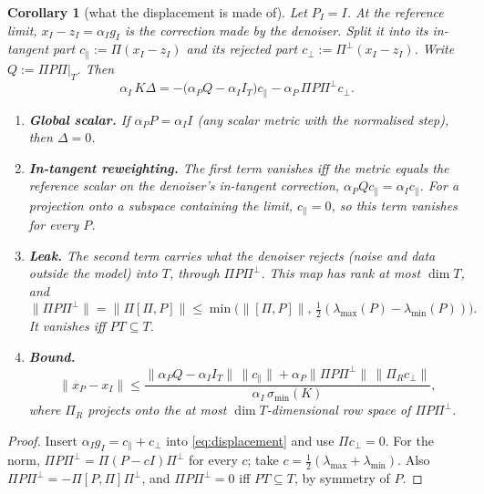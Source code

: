 \documentclass[11pt]{article}
\newtheorem{corollary}[theorem]{Corollary}
\theoremstyle{definition}
\theoremstyle{remark}
\newcommand{\norm}[1]{\lVert #1\rVert}
\newcommand{\lmin}{\lambda_{\min}}
\newcommand{\lmax}{\lambda_{\max}}
\begin{document}
\begin{corollary}[what the displacement is made of]\label{cor:displacement}
Let $P_I=I$. At the reference limit, $x_I-z_I=\alpha_Ig_I$ is the correction made by the denoiser. Split it into
its in-tangent part $c_\parallel:=\Pi(x_I-z_I)$ and its rejected part $c_\perp:=\Pi^\perp(x_I-z_I)$. Write
$Q:=\Pi P\Pi|_T$. Then
\begin{equation}\label{eq:dispsplit}
  \alpha_I\,K\Delta=-\big(\alpha_PQ-\alpha_II_T\big)c_\parallel-\alpha_P\,\Pi P\Pi^\perp c_\perp .
\end{equation}
\begin{enumerate}
\item \textbf{Global scalar.} If $\alpha_PP=\alpha_II$ (any scalar metric with the normalised step), then $\Delta=0$.
\item \textbf{In-tangent reweighting.} The first term vanishes iff the metric equals the reference scalar on the
  denoiser's in-tangent correction, $\alpha_PQc_\parallel=\alpha_Ic_\parallel$. For a projection onto a subspace
  containing the limit, $c_\parallel=0$, so this term vanishes for every $P$.
\item \textbf{Leak.} The second term carries what the denoiser \emph{rejects} (noise and data outside the model)
  into $T$, through $\Pi P\Pi^\perp$. This map has rank at most $\dim T$, and
  \[
  \norm{\Pi P\Pi^\perp}=\norm{\Pi[\Pi,P]}\leq\min\big(\norm{[\Pi,P]},\,\tfrac12(\lmax(P)-\lmin(P))\big).
  \]
  It vanishes iff $PT\subseteq T$.
\item \textbf{Bound.}
  \[
  \norm{x_P-x_I}\leq\frac{\norm{\alpha_PQ-\alpha_II_T}\,\norm{c_\parallel}+\alpha_P\norm{\Pi P\Pi^\perp}\,\norm{\Pi_Rc_\perp}}{\alpha_I\,\sigma_{\min}(K)},
  \]
  where $\Pi_R$ projects onto the at most $\dim T$-dimensional row space of $\Pi P\Pi^\perp$.
\end{enumerate}
\end{corollary}
\begin{proof}
Insert $\alpha_Ig_I=c_\parallel+c_\perp$ into \eqref{eq:displacement} and use $\Pi c_\perp=0$. For the norm,
$\Pi P\Pi^\perp=\Pi(P-cI)\Pi^\perp$ for every $c$; take $c=\tfrac12(\lmax+\lmin)$. Also
$\Pi P\Pi^\perp=-\Pi[P,\Pi]\Pi^\perp$, and $\Pi P\Pi^\perp=0$ iff $PT\subseteq T$, by symmetry of $P$.
\end{proof}
\end{document}

